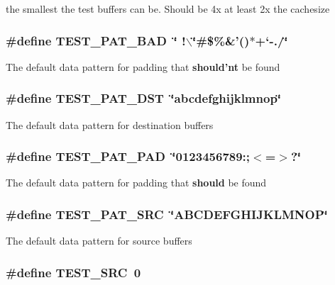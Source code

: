the smallest the test buffers can be.  Should be 4x at least 2x the cachesize 
\subsubsection{\setlength{\rightskip}{0pt plus 5cm}\#define TEST\_\-PAT\_\-BAD\ \char`\"{} !$\backslash$\char`\"{}\#\$\%\&'()$\ast$+`-./\char`\"{}}\label{test__utils_8h_a9}


The default data pattern for padding that {\bf should'nt} be found 
\subsubsection{\setlength{\rightskip}{0pt plus 5cm}\#define TEST\_\-PAT\_\-DST\ \char`\"{}abcdefghijklmnop\char`\"{}}\label{test__utils_8h_a7}


The default data pattern for destination buffers 
\subsubsection{\setlength{\rightskip}{0pt plus 5cm}\#define TEST\_\-PAT\_\-PAD\ \char`\"{}0123456789:;$<$=$>$?\char`\"{}}\label{test__utils_8h_a8}


The default data pattern for padding that {\bf should} be found 
\subsubsection{\setlength{\rightskip}{0pt plus 5cm}\#define TEST\_\-PAT\_\-SRC\ \char`\"{}ABCDEFGHIJKLMNOP\char`\"{}}\label{test__utils_8h_a6}


The default data pattern for source buffers 
\subsubsection{\setlength{\rightskip}{0pt plus 5cm}\#define TEST\_\-SRC\ 0}\label{test__utils_8h_a17}


